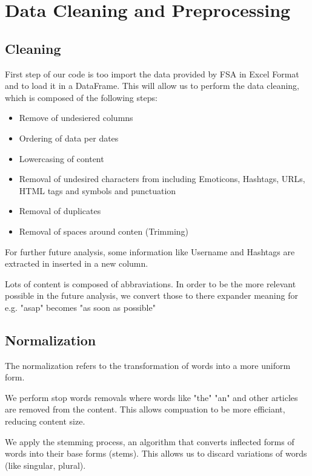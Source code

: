 \section{Data Cleaning and Preprocessing}
\label{sec:preprocessing}

\subsection{Cleaning}
\label{subsec:cleaning}

First step of our code is too import the data provided by FSA in Excel Format and to load it in a DataFrame.
This will allow us to perform the data cleaning, which is composed of the following steps:

\begin{itemize}
  \item Remove of undesiered columns
  \item Ordering of data per dates
  \item Lowercasing of content
  \item Removal of undesired characters from including Emoticons, Hashtags, URLs, HTML tags and symbols and punctuation
  \item Removal of duplicates
  \item Removal of spaces around conten (Trimming)
\end{itemize}

For further future analysis, some information like Username and Hashtags are extracted in inserted in a new column.

Lots of content is composed of abbraviations. In order to be the more relevant possible in the future analysis, we convert those to there expander meaning for e.g. "asap" becomes "as soon as possible"

\subsection{Normalization}
\label{subsec:normalization}

The normalization  refers to the transformation of words into a more uniform form.

We perform stop words removals where words like "the" "an" and other articles are removed from the content. This allows compuation to be more efficiant, reducing content size.

We apply the stemming process, an algorithm that converts inflected forms of words into their base forms (stems). This allows us to discard variations of words (like singular, plural).

